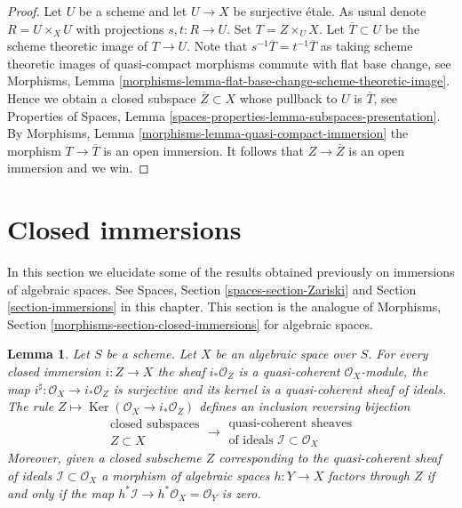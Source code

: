 \documentclass{stacks-project}
\theoremstyle{plain}
\newtheorem{lemma}[subsection]{Lemma}
\theoremstyle{definition}
\theoremstyle{remark}
\numberwithin{equation}{subsection}
\def\Ker{\mathop{\mathrm{Ker}}}
\begin{document}
\begin{proof}
Let $U$ be a scheme and let $U \to X$ be surjective \'etale.
As usual denote $R = U \times_X U$ with projections
$s, t : R \to U$. Set $T = Z \times_U X$. Let $\overline{T} \subset U$
be the scheme theoretic image of $T \to U$. Note that
$s^{-1}\overline{T} = t^{-1}\overline{T}$ as taking
scheme theoretic images of quasi-compact morphisms commute
with flat base change, see
Morphisms, Lemma \ref{morphisms-lemma-flat-base-change-scheme-theoretic-image}.
Hence we obtain a closed subspace $\overline{Z} \subset X$ whose
pullback to $U$ is $\overline{T}$, see
Properties of Spaces, Lemma
\ref{spaces-properties-lemma-subspaces-presentation}.
By Morphisms, Lemma \ref{morphisms-lemma-quasi-compact-immersion}
the morphism $T \to \overline{T}$
is an open immersion. It follows that $Z \to \overline{Z}$ is
an open immersion and we win.
\end{proof}


















\section{Closed immersions}
\label{section-closed-immersions}

\noindent
In this section we elucidate some of the results obtained previously on
immersions of algebraic spaces. See
Spaces, Section \ref{spaces-section-Zariski}
and
Section \ref{section-immersions} in this chapter.
This section is the analogue of
Morphisms, Section \ref{morphisms-section-closed-immersions}
for algebraic spaces.

\begin{lemma}
\label{lemma-closed-immersion-ideals}
Let $S$ be a scheme.
Let $X$ be an algebraic space over $S$.
For every closed immersion $i : Z \to X$ the sheaf
$i_*\mathcal{O}_Z$ is a quasi-coherent $\mathcal{O}_X$-module, the map
$i^\sharp : \mathcal{O}_X \to i_*\mathcal{O}_Z$ is surjective and its
kernel is a quasi-coherent sheaf of ideals. The rule
$Z \mapsto \Ker(\mathcal{O}_X \to i_*\mathcal{O}_Z)$
defines an inclusion reversing bijection
$$
\begin{matrix}
\text{closed subspaces}\\
Z \subset X
\end{matrix}
\longrightarrow
\begin{matrix}
\text{quasi-coherent sheaves}\\
\text{of ideals }\mathcal{I} \subset \mathcal{O}_X
\end{matrix}
$$
Moreover, given a closed subscheme $Z$ corresponding to the quasi-coherent
sheaf of ideals $\mathcal{I} \subset \mathcal{O}_X$ a morphism of algebraic
spaces $h : Y \to X$ factors through $Z$ if and only if the map
$h^*\mathcal{I} \to h^*\mathcal{O}_X = \mathcal{O}_Y$ is zero.
\end{lemma}
\end{document}
